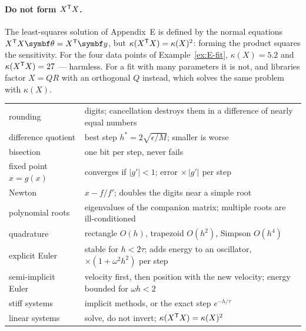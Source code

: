 \paragraph{Do not form $X^{\mathsf{T}} X$.} The least-squares solution of Appendix~E is defined by the normal equations $X^\T X\symbf\theta = X^\T\symbf y$, but $\kappa(X^{\mathsf{T}} X) = \kappa(X)^2$: forming the product squares the sensitivity. For the four data points of Example~\ref{ex:E-fit}, $\kappa(X) = 5.2$ and $\kappa(X^{\mathsf{T}} X) = 27$ — harmless. For a fit with many parameters it is not, and libraries factor $X = QR$ with an orthogonal $Q$ instead, which solves the same problem with $\kappa(X)$.

\begin{result}
\begin{center}\small
\renewcommand{\arraystretch}{1.4}
\begin{tabularx}{\linewidth}{@{}l>{\raggedright\arraybackslash}X@{}}
rounding & 16 digits; cancellation destroys them in a difference of nearly equal numbers\\
difference quotient & best step $h^* = 2\sqrt{\epsilon/M}$; smaller is worse\\
bisection & one bit per step, never fails\\
fixed point $x = g(x)$ & converges if $|g'| < 1$; error $\times\,|g'|$ per step\\
Newton & $x - f/f'$; doubles the digits near a simple root\\
polynomial roots & eigenvalues of the companion matrix; multiple roots are ill-conditioned\\
quadrature & rectangle $O(h)$, trapezoid $O(h^2)$, Simpson $O(h^4)$\\
explicit Euler & stable for $h < 2\tau$; adds energy to an oscillator, $\times(1 + \omega^2h^2)$ per step\\
semi-implicit Euler & velocity first, then position with the new velocity; energy bounded for $\omega h < 2$\\
stiff systems & implicit methods, or the exact step $e^{-h/\tau}$\\
linear systems & solve, do not invert; $\kappa(X^{\mathsf{T}} X) = \kappa(X)^2$\\
\end{tabularx}
\end{center}
\end{result}
